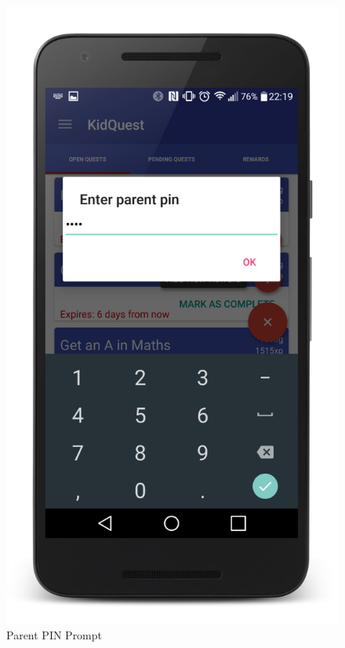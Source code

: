 \begin{figure}[ht] 
  \begin{minipage}[b]{0.45\linewidth}
    \centering
    \includegraphics[width=.8\linewidth]{../images/Screenshot/ParentPinPrompt.jpg} 
    \caption{Parent PIN Prompt} 
    \vspace{4ex}
  \end{minipage}%
  \begin{minipage}[b]{0.45\linewidth}
    \centering

\end{minipage}
\end{figure}
